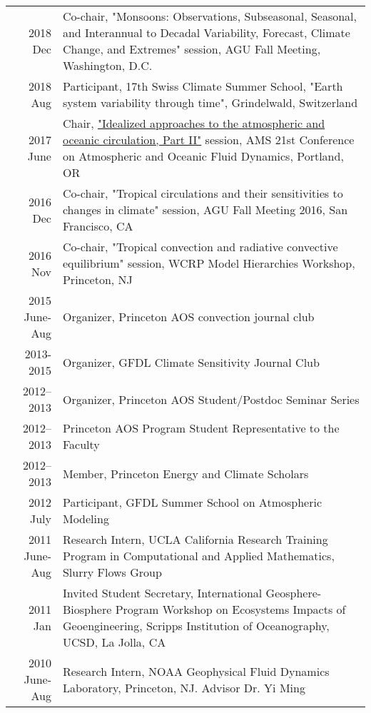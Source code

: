 \documentclass[12pt,letterpaper]{shillcv}
\begin{document}
\begin{center}
\begin{tabularx}{\textwidth}{rX}
2018 Dec & Co-chair, "Monsoons: Observations, Subseasonal, Seasonal, and Interannual to Decadal Variability, Forecast, Climate Change, and Extremes" session, AGU Fall Meeting, Washington, D.C.\\
2018 Aug & Participant, 17th Swiss Climate Summer School, "Earth system variability through time", Grindelwald, Switzerland\\
2017 June & Chair, \href{https://ams.confex.com/ams/21Fluid19Middle/webprogram/Session43327.html}{"Idealized approaches to the atmospheric and oceanic circulation, Part II"} session, AMS 21st Conference on Atmospheric and Oceanic Fluid Dynamics, Portland, OR\\
2016 Dec & Co-chair, "Tropical circulations and their sensitivities to changes in climate" session, AGU Fall Meeting 2016, San Francisco, CA\\
2016 Nov & Co-chair, "Tropical convection and radiative convective equilibrium" session, WCRP Model Hierarchies Workshop, Princeton, NJ\\
2015 June-Aug & Organizer, Princeton AOS convection journal club\\
2013-2015 & Organizer, GFDL Climate Sensitivity Journal Club\\
2012–2013 & Organizer, Princeton AOS Student/Postdoc Seminar Series\\
2012–2013 & Princeton AOS Program Student Representative to the Faculty\\
2012–2013 & Member, Princeton Energy and Climate Scholars\\
2012 July & Participant, GFDL Summer School on Atmospheric Modeling\\
2011 June-Aug & Research Intern, UCLA California Research Training Program in Computational and Applied Mathematics, Slurry Flows Group\\
2011 Jan & Invited Student Secretary, International Geosphere-Biosphere Program Workshop on Ecosystems Impacts of Geoengineering, Scripps Institution of Oceanography, UCSD, La Jolla, CA\\
2010 June-Aug & Research Intern, NOAA Geophysical Fluid Dynamics Laboratory, Princeton, NJ. Advisor Dr. Yi Ming\\
\end{tabularx}
\end{center}
\end{document}
